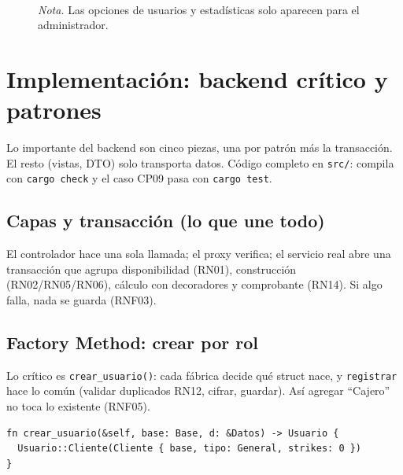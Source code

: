 \documentclass[12pt]{article}
\begin{document}
\begin{figure}[H]
\\[3pt]{\small\textit{Nota.} Las opciones de usuarios y estad{\'i}sticas solo aparecen para el administrador.}
\end{figure}
\section{Implementaci{\'o}n: backend cr{\'i}tico y patrones}
Lo importante del backend son cinco piezas, una por patr{\'o}n m{\'a}s la transacci{\'o}n. El resto (vistas, DTO) solo transporta datos. C{\'o}digo completo en \texttt{src/}: compila con \texttt{cargo check} y el caso CP09 pasa con \texttt{cargo test}.
\subsection{Capas y transacci{\'o}n (lo que une todo)}
El controlador hace una sola llamada; el proxy verifica; el servicio real abre una transacci{\'o}n que agrupa disponibilidad (RN01), construcci{\'o}n (RN02/RN05/RN06), c{\'a}lculo con decoradores y comprobante (RN14). Si algo falla, nada se guarda (RNF03).
\subsection{Factory Method: crear por rol}
Lo cr{\'i}tico es \texttt{crear\_usuario()}: cada f{\'a}brica decide qu{\'e} struct nace, y \texttt{registrar} hace lo com{\'u}n (validar duplicados RN12, cifrar, guardar). As{\'i} agregar ``Cajero'' no toca lo existente (RNF05).
\begin{lstlisting}
fn crear_usuario(&self, base: Base, d: &Datos) -> Usuario {
  Usuario::Cliente(Cliente { base, tipo: General, strikes: 0 })
}
\end{lstlisting}
\end{document}
